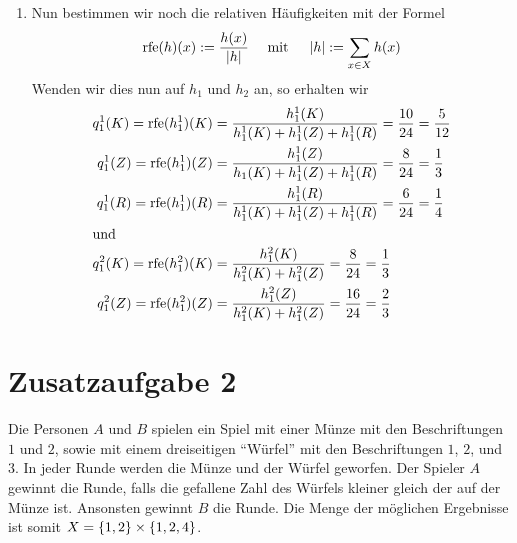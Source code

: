 \documentclass[ngerman, a4paper, 12pt]{article}
\DeclareMathOperator{\rfe}{rfe}
\begin{document}
\begin{enumerate}[label=\textbf{(\alph*)}, leftmargin=0pt]

	\item 
	Nun bestimmen wir noch die relativen Häufigkeiten mit der Formel
	\begin{equation*}
		\rfe(h)(x) \defeq \frac{h(x)}{\abs{h}} \quad \mit \quad \abs{h} \defeq \sum_{x \in X} h(x)
	\end{equation*}
	Wenden wir dies nun auf $h_1$ und $h_2$ an, so erhalten wir
	\begin{align*}
		q_1^1(K) = \rfe(h_1^1)(K) &= \frac{h_1^1(K)}{h_1^1(K) + h_1^1(Z) + h_1^1(R)} = \frac{10}{24} = \frac{5}{12} \\
		q_1^1(Z) = \rfe(h_1^1)(Z) &= \frac{h_1^1(Z)}{h_1(K) + h_1^1(Z) + h_1^1(R)} = \frac{8}{24} = \frac{1}{3} \\
		q_1^1(R) = \rfe(h_1^1)(R) &= \frac{h_1^1(R)}{h_1^1(K) + h_1^1(Z) + h_1^1(R)} = \frac{6}{24} = \frac{1}{4} \\
		\intertext{und}
		q_1^2(K) = \rfe(h_1^2)(K) &= \frac{h_1^2(K)}{h_1^2(K) + h_1^2(Z)} = \frac{8}{24} = \frac{1}{3} \\
		q_1^2(Z) = \rfe(h_1^2)(Z) &= \frac{h_1^2(Z)}{h_1^2(K) + h_1^2(Z)} = \frac{16}{24} = \frac{2}{3} \\
	\end{align*}
\end{enumerate}	
		
\section*{Zusatzaufgabe 2}

	Die Personen $A$ und $B$ spielen ein Spiel mit einer Münze mit den Beschriftungen $1$ und $2$, sowie mit einem dreiseitigen \enquote{Würfel} mit den Beschriftungen $1$, $2$, und $3$. In jeder Runde werden die
	Münze und der Würfel geworfen. Der Spieler $A$ gewinnt die Runde, falls die gefallene Zahl des Würfels kleiner gleich der auf der Münze ist. Ansonsten gewinnt $B$ die Runde. Die Menge der möglichen Ergebnisse ist somit $X = \left\{ 1, 2 \right\} \times \left\{ 1,2,4 \right\}$.
	 
\end{document}
